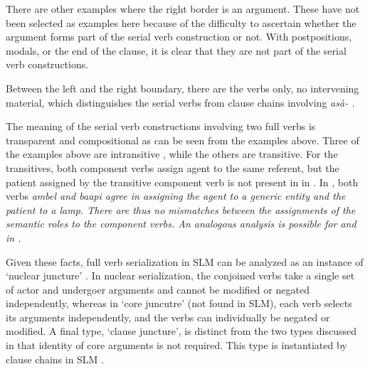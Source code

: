 There are other examples where the right border is an argument. These have not been selected as examples here because of the difficulty to ascertain whether the argument forms part of the serial verb construction or not. With postpositions, modals, or the end of the clause, it is clear that they are  not part of the serial verb constructions.  

Between the left and the right boundary, there are  the verbs only, no intervening material, which distinguishes the serial verbs from clause chains involving \em asà- \em {}.


The meaning of the serial verb constructions involving two full verbs is transparent and compositional as can be seen from the examples above.  Three of the examples above are intransitive , while the others are transitive. For the transitives, both component verbs assign agent to the same referent, but the patient assigned by the transitive component verb is not present in  in . In , both verbs \em ambel \em and \em baapi \em agree in assigning the agent to a generic entity and the patient to a lamp. There are thus no mismatches between the assignments of the semantic roles to the component verbs. An analogous analysis is possible for  and  in .

Given these facts, full verb serialization in SLM can be analyzed as an instance of `nuclear juncture' \citep{FoleyEtAl1985, VanValinEtAl1997}. In nuclear serialization, the conjoined verbs take a single set of actor and undergoer arguments and cannot be modified or negated independently, whereas in `core juncutre' (not found in SLM), each verb selects its arguments independently, and the verbs can individually be negated or modified. A final type, `clause juncture', is distinct from the two types discussed in that identity of core arguments is not required. This type is instantiated by clause chains in SLM .




